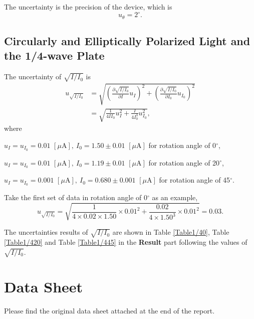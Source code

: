 \documentclass{article}
\begin{document}
The uncertainty is the precision of the device, which is 
$$u_\theta = 2^\circ.$$

\subsection{Circularly and Elliptically Polarized Light and the 1/4-wave Plate}

The uncertainty of $\sqrt{I/I_0}$ is
\begin{align*}
u_{\sqrt{I/I_{0}}}&=\sqrt{(\frac{\partial\sqrt{I/I_0}}{\partial I}u_{I})^{2}+(\frac{\partial\sqrt{I/I_0}}{\partial I_{0}}u_{I_{0}})^{2}}\\
&=\sqrt{\frac{1}{4II_0}u_I^2+\frac{I}{4I_0^3}u_{I_0}^2},
\end{align*}
where 

$u_I = u_{I_0} = 0.01\,\,[\mu\text{A}],~I_0 = 1.50 \pm 0.01\,\,[\mu\text{A}]$ for rotation angle of 0$^\circ$, 

$u_I = u_{I_0} = 0.01\,\,[\mu\text{A}],~I_0 = 1.19 \pm 0.01\,\,[\mu\text{A}]$ for rotation angle of 20$^\circ$, 

$u_I = u_{I_0} = 0.001\,\,[\mu\text{A}],~I_0 = 0.680 \pm 0.001\,\,[\mu\text{A}]$ for rotation angle of 45$^\circ$. 

Take the first set of data in rotation angle of 0$^\circ$ as an example,
$$u_{\sqrt{I/I_{0}}}=\sqrt{\frac{1}{4\times 0.02 \times 1.50} \times 0.01^2+\frac{0.02}{4\times 1.50^3}\times 0.01^2}=0.03.$$

The uncertainties results of $\sqrt{I/I_0}$ are shown in Table \ref{Table1/40}, Table \ref{Table1/420} and Table \ref{Table1/445} in the \textbf{Result} part following the values of  $\sqrt{I/I_0}$.


\section{Data Sheet}

Please find the original data sheet attached at the end of the report.
\end{document}
